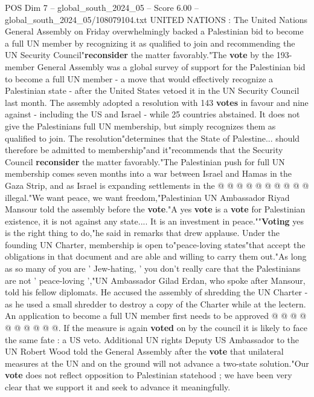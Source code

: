 \begin{textsample}{POS Dim 7 – global\_south\_2024\_05 – Score 6.00 – global\_south\_2024\_05/108079104.txt}  \label{ex:f7_pos_216}
UNITED NATIONS : The United Nations General Assembly on Friday overwhelmingly backed a Palestinian bid to become a full UN member by recognizing it as qualified to join and recommending the UN Security Council"\textbf{reconsider} the matter favorably."The \textbf{vote} by the 193-member General Assembly was a global survey of support for the Palestinian bid to become a full UN member - a move that would effectively recognize a Palestinian state - after the United States vetoed it in the UN Security Council last month.
The assembly adopted a resolution with 143 \textbf{votes} in favour and nine against - including the US and Israel - while 25 countries abstained.
It does not give the Palestinians full UN membership, but simply recognizes them as qualified to join.
The resolution"determines that the State of Palestine... should therefore be admitted to membership"and it"recommends that the Security Council \textbf{reconsider} the matter favorably."The Palestinian push for full UN membership comes seven months into a war between Israel and Hamas in the Gaza Strip, and as Israel is expanding settlements in the @ @ @ @ @ @ @ @ @ @ illegal."We want peace, we want freedom,"Palestinian UN Ambassador Riyad Mansour told the assembly before the \textbf{vote}."A yes \textbf{vote} is a \textbf{vote} for Palestinian existence, it is not against any state....
It is an investment in peace.""\textbf{Voting} yes is the right thing to do,"he said in remarks that drew applause.
Under the founding UN Charter, membership is open to"peace-loving states"that accept the obligations in that document and are able and willing to carry them out."As long as so many of you are ' Jew-hating, ' you don't really care that the Palestinians are not ' peace-loving ',"UN Ambassador Gilad Erdan, who spoke after Mansour, told his fellow diplomats.
He accused the assembly of shredding the UN Charter - as he used a small shredder to destroy a copy of the Charter while at the lectern.
An application to become a full UN member first needs to be approved @ @ @ @ @ @ @ @ @ @.
If the measure is again \textbf{voted} on by the council it is likely to face the same fate : a US veto.
Additional UN rights Deputy US Ambassador to the UN Robert Wood told the General Assembly after the \textbf{vote} that unilateral measures at the UN and on the ground will not advance a two-state solution."Our \textbf{vote} does not reflect opposition to Palestinian statehood ; we have been very clear that we support it and seek to advance it meaningfully.

\end{textsample}
